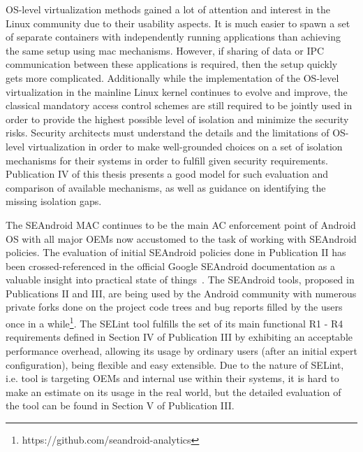 OS-level virtualization methods gained a lot of attention and interest in the Linux community due to their usability aspects. It is much easier to spawn a set of separate containers with independently running applications than achieving the same setup using \gls{mac} mechanisms. However, if sharing of data or IPC communication between these applications is required, then the setup quickly gets more complicated. Additionally while the implementation of the OS-level virtualization in the mainline Linux kernel continues to evolve and improve, the classical mandatory access control schemes are still required to be jointly used in order to provide the highest possible level of isolation and minimize the security risks. Security architects must understand the details and the limitations of OS-level virtualization in order to make well-grounded choices on a set of isolation mechanisms for their systems in order to fulfill given security requirements. Publication IV of this thesis presents a good model for such evaluation and comparison of available mechanisms, as well as guidance on identifying the missing isolation gaps. 

The SEAndroid MAC continues to be the main AC enforcement point of Android OS with all major OEMs now accustomed to the task of working with SEAndroid policies. The evaluation of initial SEAndroid policies done in Publication II has been crossed-referenced in the official Google SEAndroid documentation as a valuable insight into practical state of things~\cite{seanroidsize}. The SEAndroid tools, proposed in Publications II and III, are being used by the Android community with numerous private forks done on the project code trees and bug reports filled by the users once in a while\footnote{https://github.com/seandroid-analytics}. The SELint tool fulfills the set of its main functional R1 - R4 requirements defined in Section IV of Publication III by exhibiting an acceptable performance overhead, allowing its usage by ordinary users (after an initial expert configuration), being flexible and easy extensible. Due to the nature of SELint, i.e. tool is targeting OEMs and internal use within their systems, it is hard to make an estimate on its usage in the real world, but the detailed evaluation of the tool can be found in Section V of Publication III. 

